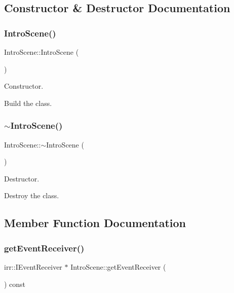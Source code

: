 \subsection{Constructor \& Destructor Documentation}
\mbox{\label{classIntroScene_a3691b51409f65b40f0c84008e49ef32b}} 
\subsubsection{\texorpdfstring{Intro\+Scene()}{IntroScene()}}
{\footnotesize\ttfamily Intro\+Scene\+::\+Intro\+Scene (\begin{DoxyParamCaption}{ }\end{DoxyParamCaption})}



Constructor. 

Build the class. \mbox{\label{classIntroScene_a7cdb50b55c0f5cf66b7bd151e4abe2b1}} 
\subsubsection{\texorpdfstring{$\sim$\+Intro\+Scene()}{~IntroScene()}}
{\footnotesize\ttfamily Intro\+Scene\+::$\sim$\+Intro\+Scene (\begin{DoxyParamCaption}{ }\end{DoxyParamCaption})}



Destructor. 

Destroy the class. 

\subsection{Member Function Documentation}
\mbox{\label{classIntroScene_acabf925dab7b2a346edd398445cd5800}} 
\subsubsection{\texorpdfstring{get\+Event\+Receiver()}{getEventReceiver()}}
{\footnotesize\ttfamily irr\+::\+I\+Event\+Receiver $\ast$ Intro\+Scene\+::get\+Event\+Receiver (\begin{DoxyParamCaption}{ }\end{DoxyParamCaption}) const\hspace{0.3cm}{\ttfamily [virtual]}}



